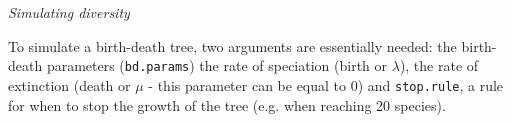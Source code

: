 \documentclass[12pt,letterpaper]{article}
\renewcommand{\subsection}[1]{%
\bigskip
\begin{center}
\begin{large}
\normalfont\itshape #1
\end{large}
\end{center}}
\begin{document}
\subsection{Simulating diversity}

To simulate a birth-death tree, two arguments are essentially needed: the birth-death parameters (\texttt{bd.params}) the rate of speciation (birth or $\lambda$), the rate of extinction (death or $\mu$ - this parameter can be equal to 0) and \texttt{stop.rule}, a rule for when to stop the growth of the tree (e.g. when reaching 20 species).






\end{document}
